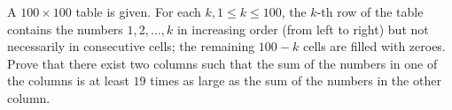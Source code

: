 A $100 \times 100$ table is given. For each $k, 1 \le k \le 100$,  the $k$-th row of the table contains the numbers $1,2,\dotsc,k$ in increasing order (from left to right) but not necessarily in consecutive cells; the remaining $100-k$ cells are filled with zeroes. Prove that there exist two columns such that the sum of the numbers in one of the columns is at least $19$ times as large as the sum of the numbers in the other column.